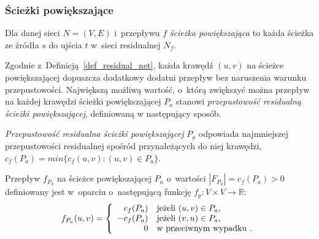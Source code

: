 \subsubsection{\textbf{Ścieżki powiększające}}
\par{
  \begin{definition}
    Dla danej sieci $N=(V,E)$ i~przepływu $f$ \emph{ścieżka powiększająca} to każda ścieżka ze źródła $s$ do ujścia $t$ w~sieci residualnej $N_f$.
  \end{definition}
  Zgodnie z~Definicją~\ref{def_residual_net}, każda krawędź $(u, v)$ na ścieżce powiększającej dopuszcza dodatkowy dodatni przepływ bez naruszenia warunku przepustowości.
  Największą możliwą wartość, o~którą zwiększyć można przepływ na każdej krawędzi ścieżki powiększającej $P_a$ stanowi \emph{przepustowość residualną ścieżki powiększającej}, definiowaną w następujący sposób.
  \begin{definition}
    \emph{Przepustowość residualna ścieżki powiększającej} $P_a$ odpowiada najmniejszej przepustowości residualnej spośród przynależących do niej krawędzi, $c_f(P_a) = min\{c_f(u, v):(u, v)\in P_a\}$.
  \end{definition}
  \begin{definition}
    Przepływ $f_{P_a}$ na ścieżce powiększającej $P_a$ o~wartości $|F_{P_a}| = c_f(P_a) > 0$ definiowany jest w~oparciu o~następującą funkcję $f_p: V \times V \rightarrow \mathbb{R}$: 
    \begin{equation*}
    f_{P_a}(u, v) = \left\{
    \begin{array}{rl}
    c_f(P_a) & \textnormal{jeżeli } (u, v) \in P_a,\\
    -c_f(P_a) & \textnormal{jeżeli } (v, u) \in P_a,\\
    0 & \textnormal{w przeciwnym wypadku }.
    \end{array} \right.
    \end{equation*}
  \end{definition}
}
